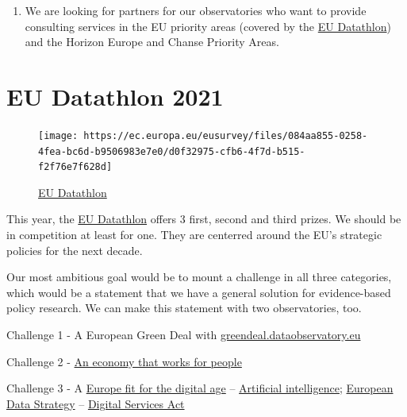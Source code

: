 \documentclass[
  fontsize=13pt,
  english,
  a4paper,
  openany, a4paper, oneside]{book}
\providecommand{\tightlist}{%
  \setlength{\itemsep}{0pt}\setlength{\parskip}{0pt}}
\begin{document}
\begin{enumerate}
\def\labelenumi{\arabic{enumi}.}
\setcounter{enumi}{3}
\tightlist
\item
  We are looking for partners for our observatories who want to provide consulting services in the EU priority areas (covered by the \protect\hyperlink{eu-datathlon}{EU Datathlon}) and the Horizon Europe and Chanse Priority Areas.
\end{enumerate}

\hypertarget{eu-datathlon}{%
\section{EU Datathlon 2021}\label{eu-datathlon}}

\begin{figure}
\centering
\texttt{[image: https://ec.europa.eu/eusurvey/files/084aa855-0258-4fea-bc6d-b9506983e7e0/d0f32975-cfb6-4f7d-b515-f2f76e7f628d]}
\caption{\href{https://ec.europa.eu/eusurvey/runner/EU-Datathon-2021-project-descriptions}{EU Datathlon}}
\end{figure}

This year, the \href{https://ec.europa.eu/eusurvey/runner/EU-Datathon-2021-project-descriptions}{EU Datathlon} offers 3 first, second and third prizes. We should be in competition at least for one. They are centerred around the EU's strategic policies for the next decade.

Our most ambitious goal would be to mount a challenge in all three categories, which would be a statement that we have a general solution for evidence-based policy research. We can make this statement with two observatories, too.

Challenge 1 - A European Green Deal with \href{https://naughty-jepsen-95cdf2.netlify.app/}{greendeal.dataobservatory.eu}

Challenge 2 - \href{https://ec.europa.eu/info/strategy/priorities-2019-2024/economy-works-people_en}{An economy that works for people}

Challenge 3 - A \href{https://ec.europa.eu/info/strategy/priorities-2019-2024/europe-fit-digital-age_en}{Europe fit for the digital age} -- \href{https://ec.europa.eu/info/strategy/priorities-2019-2024/europe-fit-digital-age/excellence-trust-artificial-intelligence_en}{Artificial intelligence}; \href{https://ec.europa.eu/info/strategy/priorities-2019-2024/europe-fit-digital-age/european-data-strategy_en}{European Data Strategy} -- \href{https://ec.europa.eu/info/strategy/priorities-2019-2024/europe-fit-digital-age/digital-services-act-ensuring-safe-and-accountable-online-environment_en}{Digital Services Act}
\end{document}
